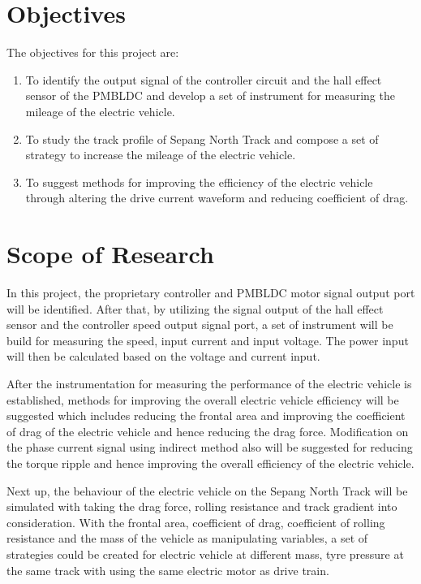 \section{Objectives}

The objectives for this project are:

\begin{enumerate}
	\item To identify the output signal of the controller circuit and the hall effect sensor of the PMBLDC and develop a set of instrument for measuring the mileage of the electric vehicle.
	\item To study the track profile of Sepang North Track and compose a set of strategy to increase the mileage of the electric vehicle.
	\item To suggest methods for improving the efficiency of the electric vehicle through altering the drive current waveform and reducing coefficient of drag.
\end{enumerate}

\section{Scope of Research}

In this project, the proprietary controller and PMBLDC motor signal output port will be identified. After that, by utilizing the signal output of the hall effect sensor and the controller speed output signal port, a set of instrument will be build for measuring the speed, input current and input voltage. The power input will then be calculated based on the voltage and current input.


After the instrumentation for measuring the performance of the electric vehicle is established, methods for improving the overall electric vehicle efficiency will be suggested which includes reducing the frontal area and improving the coefficient of drag of the electric vehicle and hence reducing the drag force. Modification on the phase current signal using indirect method also will be suggested for reducing the torque ripple and hence improving the overall efficiency of the electric vehicle.

Next up, the behaviour of the electric vehicle on the Sepang North Track will be simulated with taking the drag force, rolling resistance and track gradient into consideration. With the frontal area, coefficient of drag, coefficient of rolling resistance and the mass of the vehicle as manipulating variables, a set of strategies could be created for electric vehicle at different mass, tyre pressure at the same track with using the same electric motor as drive train.

